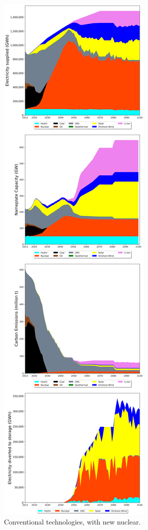 \begin{figure}[h] 
\centering
\label{scen2}
\includegraphics[scale=0.25]{figures/conv_nuc}
\caption{Conventional technologies, with new nuclear.}
\end{figure}

